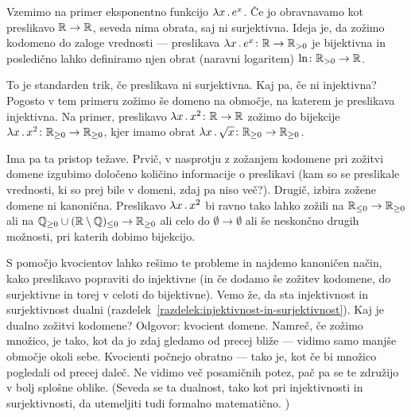                 Vzemimo na primer eksponentno funkcijo $\xlam{x}{e^x}$. Če jo obravnavamo kot preslikavo $\mathbb{R} \to \mathbb{R}$, seveda nima obrata, saj ni surjektivna. Ideja je, da zožimo kodomeno do zaloge vrednosti --- preslikava $\xlam{x}{e^x}\colon \RR \to \RR_{> 0}$ je bijektivna in posledično lahko definiramo njen obrat (naravni logaritem) $\ln\colon \mathbb{R}_{> 0} \to \mathbb{R}$.

                To je standarden trik, če preslikava ni surjektivna. Kaj pa, če ni injektivna? Pogosto v tem primeru zožimo še domeno na območje, na katerem je preslikava injektivna. Na primer, preslikavo $\xlam{x}{x^2}\colon \RR \to \RR$ zožimo do bijekcije $\xlam{x}{x^2}\colon \RR_{\geq 0} \to \RR_{\geq 0}$, kjer imamo obrat $\xlam{x}{\sqrt{x}}\colon \RR_{\geq 0} \to \RR_{\geq 0}$.

                Ima pa ta pristop težave. Prvič, v nasprotju z zožanjem kodomene pri zožitvi domene izgubimo določeno količino informacije o preslikavi (kam so se preslikale vrednosti, ki so prej bile v domeni, zdaj pa niso več?). Drugič, izbira zožene domene ni kanonična. Preslikavo $\xlam{x}{x^2}$ bi ravno tako lahko zožili na $\mathbb{R}_{\leq 0} \to \mathbb{R}_{\geq 0}$ ali na $\mathbb{Q}_{\geq 0} \cup (\mathbb{R} \setminus \mathbb{Q})_{\leq 0} \to \mathbb{R}_{\geq 0}$ ali celo do $\emptyset \to \emptyset$ ali še neskončno drugih možnosti, pri katerih dobimo bijekcijo.

                S pomočjo kvocientov lahko rešimo te probleme in najdemo kanoničen način, kako preslikavo popraviti do injektivne (in če dodamo še zožitev kodomene, do surjektivne in torej v celoti do bijektivne). Vemo že, da sta injektivnost in surjektivnost dualni (razdelek~\ref{razdelek:injektivnost-in-surjektivnost}). Kaj je dualno zožitvi kodomene? Odgovor: kvocient domene. Namreč, če zožimo množico, je tako, kot da jo zdaj gledamo od precej bliže --- vidimo samo manjše območje okoli sebe. Kvocienti počnejo obratno --- tako je, kot če bi množico pogledali od precej daleč. Ne vidimo več posamičnih potez, pač pa se te združijo v bolj splošne oblike. (Seveda se ta dualnost, tako kot pri injektivnosti in surjektivnosti, da utemeljiti tudi formalno matematično. )

